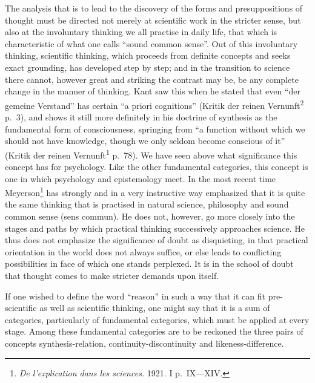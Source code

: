 \documentclass[12pt]{article}
\newcommand{\opage}[1]{\marginnote{\footnotesize\textit{[#1]}}}
\begin{document}
The analysis that is to lead to the discovery of the forms and
presuppositions of thought must be directed not merely at scientific work in
the stricter sense, but also at the involuntary thinking we all practise in
daily life, that which is characteristic of what one calls ``sound common
sense''. Out of this involuntary thinking, scientific thinking, which
proceeds from definite concepts and seeks exact grounding, has developed
step by step; and in the transition to science there cannot, however great
and striking the contrast may be, be any complete change in the manner of
thinking. Kant saw this when he stated that even ``der gemeine Verstand''
has certain ``a priori cognitions'' (Kritik der reinen
Vernunft\textsuperscript{2} p.~3), and shows it still more definitely in his
doctrine of synthesis as the fundamental form of consciousness, springing
from ``a function without which we should not have knowledge, though we only
seldom become conscious of it'' (Kritik der reinen
Vernunft\textsuperscript{1} p.~78). We have seen above what significance
this concept has for psychology. Like the other fundamental categories, this
concept is one in which psychology and epistemology meet. In the most recent
time Meyerson\footnote{\textit{De l'explication dans les sciences.} 1921. I
p.~IX---XIV.} has strongly and in a very instructive way emphasized that it
is quite the same thinking \opage{27}that is practised in natural science, philosophy
and sound common sense (sens commun). He does not, however, go more closely
into the stages and paths by which practical thinking successively
approaches science. He thus does not emphasize the significance of doubt as
disquieting, in that practical orientation in the world does not always
suffice, or else leads to conflicting possibilities in face of which one
stands perplexed. It is in the school of doubt that thought comes to make
stricter demands upon itself.

If one wished to define the word ``reason'' in such a way that it can fit
pre-scientific as well as scientific thinking, one might say that it is a
sum of categories, particularly of fundamental categories, which must be
applied at every stage. Among these fundamental categories are to be
reckoned the three pairs of concepts synthesis-relation,
continuity-discontinuity and likeness-difference.
\end{document}
